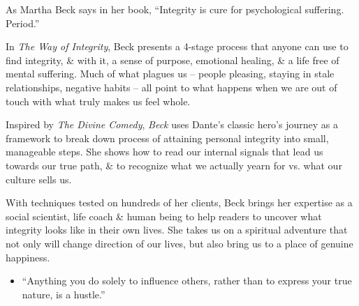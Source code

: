 \documentclass{article}
\begin{document}
\begin{enumerate}
	As {\sc Martha Beck} says in her book, ``Integrity is cure for psychological suffering. Period.''
	
	In {\it The Way of Integrity}, {\sc Beck} presents a 4-stage process that anyone can use to find integrity, \& with it, a sense of purpose, emotional healing, \& a life free of mental suffering. Much of what plagues us -- people pleasing, staying in stale relationships, negative habits -- all point to what happens when we are out of touch with what truly makes us feel whole.
	
	Inspired by {\it The Divine Comedy}, {\it Beck} uses {\sc Dante}'s classic hero's journey as a framework to break down process of attaining personal integrity into small, manageable steps. She shows how to read our internal signals that lead us towards our true path, \& to recognize what we actually yearn for vs. what our culture sells us.
	
	With techniques tested on hundreds of her clients, {\sc Beck} brings her expertise as a social scientist, life coach \& human being to help readers to uncover what integrity looks like in their own lives. She takes us on a spiritual adventure that not only will change direction of our lives, but also bring us to a place of genuine happiness.
	\begin{itemize}
		\item ``Anything you do solely to influence others, rather than to express your true nature, is a hustle.''
		

\end{itemize}
\end{enumerate}
\end{document}
